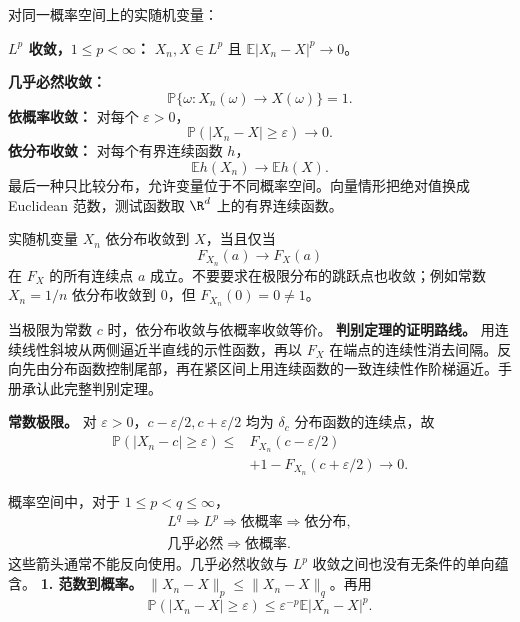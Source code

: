 对同一概率空间上的实随机变量：

\textbf{$L^p$ 收敛，$1\le p<\infty$：} $X_n,X\in L^p$ 且 $\mathbb E|X_n-X|^p\to0$。

\textbf{几乎必然收敛：}
\[
\mathbb P\{\omega:X_n(\omega)\to X(\omega)\}=1.
\]
\textbf{依概率收敛：} 对每个 $\varepsilon>0$，
\[
\mathbb P(|X_n-X|\ge\varepsilon)\longrightarrow0.
\]
\textbf{依分布收敛：} 对每个有界连续函数 $h$，
\[
\mathbb Eh(X_n)\longrightarrow\mathbb Eh(X).
\]
最后一种只比较分布，允许变量位于不同概率空间。向量情形把绝对值换成 Euclidean 范数，测试函数取 $\R^d$ 上的有界连续函数。

实随机变量 $X_n$ 依分布收敛到 $X$，当且仅当
\[
F_{X_n}(a)\to F_X(a)
\]
在 $F_X$ 的所有连续点 $a$ 成立。不要要求在极限分布的跳跃点也收敛；例如常数 $X_n=1/n$ 依分布收敛到 $0$，但 $F_{X_n}(0)=0\ne1$。

当极限为常数 $c$ 时，依分布收敛与依概率收敛等价。
\textbf{判别定理的证明路线。} 用连续线性斜坡从两侧逼近半直线的示性函数，再以 $F_X$ 在端点的连续性消去间隔。反向先由分布函数控制尾部，再在紧区间上用连续函数的一致连续性作阶梯逼近。手册承认此完整判别定理。

\textbf{常数极限。} 对 $\varepsilon>0$，$c-\varepsilon/2,c+\varepsilon/2$ 均为 $\delta_c$ 分布函数的连续点，故
\[
\begin{aligned}
\mathbb P(|X_n-c|\ge\varepsilon)
\le{}&F_{X_n}(c-\varepsilon/2)\\
&+1-F_{X_n}(c+\varepsilon/2)\to0.
\end{aligned}
\]

概率空间中，对于 $1\le p<q\le\infty$，
\[
\begin{gathered}
L^q\Longrightarrow L^p\Longrightarrow
\text{依概率}\Longrightarrow\text{依分布},\\
\text{几乎必然}\Longrightarrow\text{依概率}.
\end{gathered}
\]
这些箭头通常不能反向使用。几乎必然收敛与 $L^p$ 收敛之间也没有无条件的单向蕴含。
\textbf{1. 范数到概率。} $\|X_n-X\|_p\le\|X_n-X\|_q$。再用
\[
\mathbb P(|X_n-X|\ge\varepsilon)
\le\varepsilon^{-p}\mathbb E|X_n-X|^p.
\]

